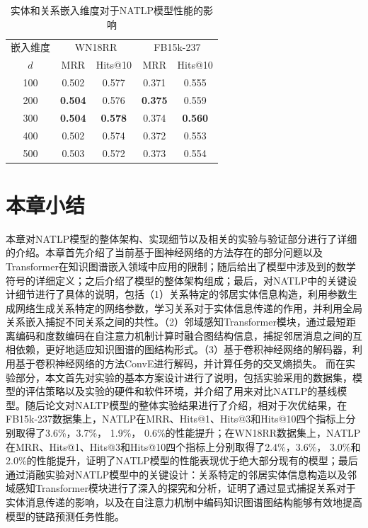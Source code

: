 \begin{table}[htbp]
  \begin{center}
      \caption{实体和关系嵌入维度对于NATLP模型性能的影响}
      \renewcommand{\arraystretch}{1.5}
      \begin{tabular}{*{5}{c}}
          \toprule
          嵌入维度& \multicolumn{2}{c}{WN18RR} & \multicolumn{2}{c}{FB15k-237}\\
          \cmidrule(lr){2-3}\cmidrule(lr){4-5}
          $d$&MRR&Hits@10&MRR&Hits@10\\
          \midrule
          100	&0.502&0.577&0.371&0.555\\
          200	&\textbf{0.504}&0.576&\textbf{0.375}&0.559\\
          300	&\textbf{0.504}&\textbf{0.578}&0.374&\textbf{0.560}\\
          400	&0.502&0.574&0.372&0.553\\
          500	&0.503&0.572&0.373&0.554\\
          \bottomrule
      \end{tabular}
      \label{dimension}
  \end{center}
\end{table}


\section{本章小结}

本章对NATLP模型的整体架构、实现细节以及相关的实验与验证部分进行了详细的介绍。本章首先介绍了当前基于图神经网络的方法存在的部分问题以及Transformer在知识图谱嵌入领域中应用的限制；随后给出了模型中涉及到的数学符号的详细定义；之后介绍了模型的整体架构组成；最后，对NATLP中的关键设计细节进行了具体的说明，包括（1）关系特定的邻居实体信息构造，利用参数生成网络生成关系特定的网络参数，学习关系对于实体信息传递的作用，并利用全局关系嵌入捕捉不同关系之间的共性。（2）邻域感知Transformer模块，通过最短距离编码和度数编码在自注意力机制计算时融合图结构信息，捕捉邻居消息之间的互相依赖，更好地适应知识图谱的图结构形式。（3）基于卷积神经网络的解码器，利用基于卷积神经网络的方法ConvE进行解码，并计算任务的交叉熵损失。
而在实验部分，本文首先对实验的基本方案设计进行了说明，包括实验采用的数据集，模型的评估策略以及实验的硬件和软件环境，并介绍了用来对比NATLP的基线模型。随后论文对NALTP模型的整体实验结果进行了介绍，相对于次优结果，在FB15k-237数据集上，NATLP在MRR、Hits@1、Hits@3和Hits@10四个指标上分别取得了3.6\%，3.7\%， 1.9\%， 0.6\%的性能提升；在WN18RR数据集上，NATLP在MRR、Hits@1、Hits@3和Hits@10四个指标上分别取得了2.4\%，3.6\%， 3.0\%和2.0\%的性能提升，证明了NATLP模型的性能表现优于绝大部分现有的模型；最后通过消融实验对NATLP模型中的关键设计：关系特定的邻居实体信息构造以及邻域感知Transformer模块进行了深入的探究和分析，证明了通过显式捕捉关系对于实体消息传递的影响，以及在自注意力机制中编码知识图谱图结构能够有效地提高模型的链路预测任务性能。